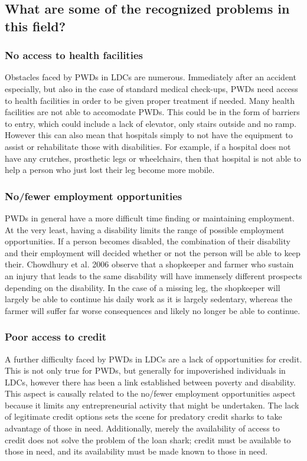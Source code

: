 \documentclass{lps}
\begin{document}
\subsection{What are some of the recognized problems in this field?}
\subsubsection{No access to health facilities}

Obstacles faced by PWDs in LDCs are numerous. Immediately after an accident especially, but also in the case of standard medical check-ups, PWDs need access to health facilities in order to be given proper treatment if needed. Many health facilities are not able to accomodate PWDs. This could be in the form of barriers to entry, which could include a lack of elevator, only stairs outside and no ramp. However this can also mean that hospitals simply to not have the equipment to assist or rehabilitate those with disabilities. For example, if a hospital does not have any crutches, prosthetic legs or wheelchairs, then that hospital is not able to help a person who just lost their leg become more mobile. 


\subsubsection{No/fewer employment opportunities}
PWDs in general have a more difficult time finding or maintaining employment. At the very least, having a disability limits the range of possible employment opportunities. If a person becomes disabled, the combination of their disability and their employment will decided whether or not the person will be able to keep their. Chowdhury et al. 2006 observe that a shopkeeper and farmer who sustain an injury that leads to the same disability will have immensely different prospects depending on the disability. In the case of a missing leg, the shopkeeper will largely be able to continue his daily work as it is largely sedentary, whereas the farmer will suffer far worse consequences and likely no longer be able to continue.

\subsubsection{Poor access to credit}
A further difficulty faced by PWDs in LDCs are a lack of opportunities for credit. This is not only true for PWDs, but generally for impoverished individuals in LDCs, however there has been a link established between poverty and disability. This aspect is causally related to the no/fewer employment opportunities aspect because it limits any entrepreneurial activity that might be undertaken. The lack of legitimate credit options sets the scene for predatory credit sharks to take advantage of those in need. Additionally, merely the availability of access to credit does not solve the problem of the loan shark; credit must be available to those in need, and its availability must be made known to those in need.
\end{document}
